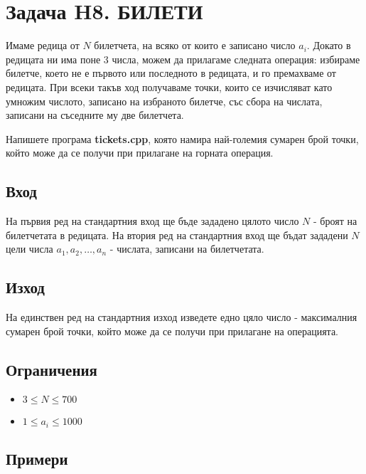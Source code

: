 \documentclass[12pt]{article}
\begin{document}
\section{Задача H8. БИЛЕТИ}

Имаме редица от $N$ билетчета, на всяко от които е записано число $a_i$. Докато в редицата ни има поне $3$ числа, можем да прилагаме следната операция: избираме билетче, което не е първото или последното в редицата, и го премахваме от редицата. При всеки такъв ход получаваме точки, които се изчисляват като умножим числото, записано на избраното билетче, със сбора на числата, записани на съседните му две билетчета.

Напишете програма \textbf{tickets.cpp}, която намира най-големия сумарен брой точки, който може да се получи при прилагане на горната операция.

\subsection{Вход}

На първия ред на стандартния вход ще бъде зададено цялото число $N$ - броят на билетчетата в редицата.
На втория ред на стандартния вход ще бъдат зададени $N$ цели числа $a_1, a_2, \dots, a_n$ - числата, записани на билетчетата.

\subsection{Изход}

На единствен ред на стандартния изход изведете едно цяло число - максималния сумарен брой точки, който може да се получи при прилагане на операцията.


\subsection{Ограничения}

\vspace{0.1em}
\begin{itemize}
	\item $3 \leq N \leq 700$
    \item $1 \leq a_i \leq 1000$
\end{itemize}

\subsection{Примери}
\end{document}
